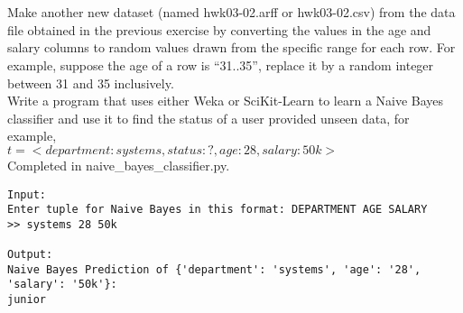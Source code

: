 \documentclass{scrartcl}
\begin{document}
\section{}
Make another new dataset (named hwk03-02.arff or hwk03-02.csv) from the data file obtained in the previous exercise by converting the values in the age and salary columns to random values drawn from the specific range for each row. For example, suppose the age of a row is “31..35”, replace it by a random integer between 31 and 35 inclusively.\\

Write a program that uses either Weka or SciKit-Learn to learn a Naive Bayes classifier and use it to find the status of a user provided unseen data, for example,\\

$t = <department: systems, status: ?, age: 28, salary: 50k>$\\

Completed in naive\_bayes\_classifier.py.
\begin{verbatim}
Input:
Enter tuple for Naive Bayes in this format: DEPARTMENT AGE SALARY
>> systems 28 50k

Output:
Naive Bayes Prediction of {'department': 'systems', 'age': '28', 'salary': '50k'}:
junior
\end{verbatim}
\end{document}
